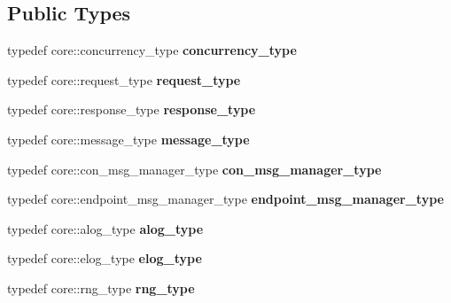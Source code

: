 \subsection*{Public Types}
\begin{DoxyCompactItemize}
\item 
typedef core\+::concurrency\+\_\+type {\bfseries concurrency\+\_\+type}\hypertarget{structstub__config_adfbabf7bc98d14349e3aaf93ce286679}{}\label{structstub__config_adfbabf7bc98d14349e3aaf93ce286679}

\item 
typedef core\+::request\+\_\+type {\bfseries request\+\_\+type}\hypertarget{structstub__config_adf25cb289c00f17e0edde3ee14c7d513}{}\label{structstub__config_adf25cb289c00f17e0edde3ee14c7d513}

\item 
typedef core\+::response\+\_\+type {\bfseries response\+\_\+type}\hypertarget{structstub__config_af5bf09e5641cb374d09ca1cc57a3db68}{}\label{structstub__config_af5bf09e5641cb374d09ca1cc57a3db68}

\item 
typedef core\+::message\+\_\+type {\bfseries message\+\_\+type}\hypertarget{structstub__config_a608dd8f08c2967a1279f862646d5ccfe}{}\label{structstub__config_a608dd8f08c2967a1279f862646d5ccfe}

\item 
typedef core\+::con\+\_\+msg\+\_\+manager\+\_\+type {\bfseries con\+\_\+msg\+\_\+manager\+\_\+type}\hypertarget{structstub__config_ac54fff1ce93b9e96d7c55f7a5f7070b6}{}\label{structstub__config_ac54fff1ce93b9e96d7c55f7a5f7070b6}

\item 
typedef core\+::endpoint\+\_\+msg\+\_\+manager\+\_\+type {\bfseries endpoint\+\_\+msg\+\_\+manager\+\_\+type}\hypertarget{structstub__config_a41f4e1a5902c7a558e4f06b223bff9e3}{}\label{structstub__config_a41f4e1a5902c7a558e4f06b223bff9e3}

\item 
typedef core\+::alog\+\_\+type {\bfseries alog\+\_\+type}\hypertarget{structstub__config_a0d27080bdc8a484a1c742853bcc92673}{}\label{structstub__config_a0d27080bdc8a484a1c742853bcc92673}

\item 
typedef core\+::elog\+\_\+type {\bfseries elog\+\_\+type}\hypertarget{structstub__config_a48001c3d916c6e12404be8ce13e7c06d}{}\label{structstub__config_a48001c3d916c6e12404be8ce13e7c06d}

\item 
typedef core\+::rng\+\_\+type {\bfseries rng\+\_\+type}\hypertarget{structstub__config_ab451127820621a9c8acf60b8f8ce62b8}{}\label{structstub__config_ab451127820621a9c8acf60b8f8ce62b8}


\end{DoxyCompactItemize}
